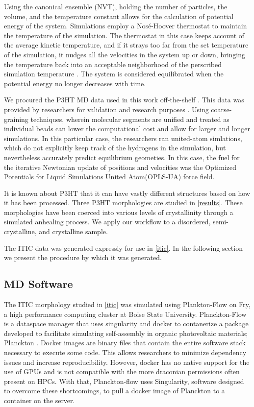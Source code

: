 Using the canonical ensemble (NVT), holding the number of
particles, the volume, and the temperature constant allows for the calculation of 
potential energy of the system.  Simulations employ a
Nos\'{e}-Hoover thermostat to maintain the temperature of the simulation. The thermostat in this case keeps
account of the average kinetic temperature, and if it strays too far from the set temperature of the
simulation, it nudges all the velocities in the system up or down, bringing the temperature back into an
acceptable neighborhood of the perscribed simulation temperature \cite{Martyna1994d}\cite{Cao1996}.
The system is considered equilibrated when the potential energy no longer decreases with time. 

We procured the P3HT MD data used in this work off-the-shelf \cite{P3HTData}. This data was provided by
researchers for validation and research purposes \cite{Miller2018}. Using coarse-graining techniques, wherein
molecular segments are unified and treated as individual beads can lower the computational cost and allow for
larger and longer simulations. In this particular case, the researchers ran united-atom simlations, which do
not explicitly keep track of the hydrogens in the simulation, but nevertheless accurately predict equilibrium
geometies. In this case, the fuel for the iterative Newtonian update of positions and velocities 
was the Optimized Potentials for Liquid Simulations United Atom(OPLS-UA) force field.

It is known about P3HT that it can have vastly
different structures based on how it has been processed. 
Three P3HT morphologies are studied in \autoref{results}. These morphologies have been coerced into various
levels of crystallinity through a simulated anhealing process. We apply our workflow to a
disordered, semi-crystalline, and crystalline sample.

The ITIC data was generated expressly for use in \autoref{itic}. In the following section we present the
procedure by which it was generated. 

\subsection{MD Software}
\label{planckton}

The ITIC morphology studied in \autoref{itic} was simulated using Plankton-Flow \cite{cmelab} on Fry, 
a high performance computing cluster at Boise State University. 
Planckton-Flow is a dataspace manager that uses
singularity \cite{singularity2017} and docker \cite{Merkel:2014:DLL:2600239.2600241} 
to contanerize a package developed to facilitate simulating self-assembly in
organic photovoltaic materials; Planckton \cite{cmelab}. Docker images are binary files that contain the
entire software stack necessary to execute some code. This allows researchers to minimize dependency issues
and increase reproducibility. However, docker has no native support for the use of GPUs and is not
compatible with the more draconian permissions often present on HPCs. With that, Planckton-flow uses 
Singularity, software designed to overcome these shortcomings,
to pull a docker image of Planckton to a container on the server. 

